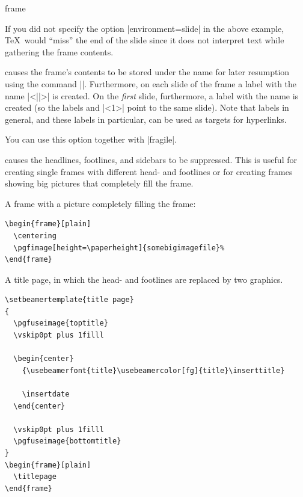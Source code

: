 \begin{environment}{{frame}}
\begin{frame}[<+->][plain]
\begin{frame}
    If you did not specify the option |environment=slide| in the above example, \TeX\ would ``miss'' the end of the slide since it does not interpret text while gathering the frame contents.
  \item
     causes the frame's contents to be stored under the name  for later resumption using the command |\againframe|. Furthermore, on each slide of the frame a label with the name |<||>| is created. On the \emph{first} slide, furthermore, a label with the name  is created (so the labels  and |<1>| point to the same slide). Note that labels in general, and these labels in particular, can be used as targets for hyperlinks.

    You can use this option together with |fragile|.
  \item
     causes the headlines, footlines, and sidebars to be suppressed. This is useful for creating single frames with different head- and footlines or for creating frames showing big pictures that completely fill the frame.

    \example
    A frame with a picture completely filling the frame:

\begin{verbatim}
\begin{frame}[plain]
  \centering
  \pgfimage[height=\paperheight]{somebigimagefile}%
\end{frame}
\end{verbatim}

    \example
    A title page, in which the head- and footlines are replaced by two graphics.

\begin{verbatim}
\setbeamertemplate{title page}
{
  \pgfuseimage{toptitle}
  \vskip0pt plus 1filll

  \begin{center}
    {\usebeamerfont{title}\usebeamercolor[fg]{title}\inserttitle}

    \insertdate
  \end{center}

  \vskip0pt plus 1filll
  \pgfuseimage{bottomtitle}
}
\begin{frame}[plain]
  \titlepage
\end{frame}
\end{verbatim}


\end{frame}
\end{frame}
\end{environment}
